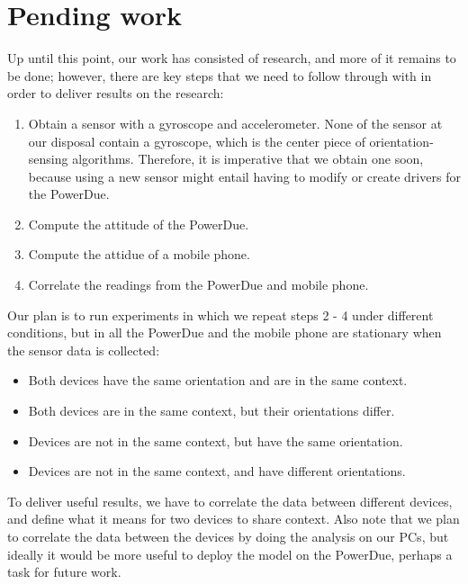 \documentclass[journal]{IEEEtranTIE}
\begin{document}
\section{Pending work}

Up until this point, our work has consisted of research, and more of it
remains to be done; however, there are key steps that we need to follow through
with in order to deliver results on the research:

\begin{enumerate}
\item Obtain a sensor with a gyroscope and accelerometer. None of the sensor at
      our disposal contain a gyroscope, which is the center piece of
      orientation-sensing algorithms. Therefore, it is imperative that we obtain
      one soon, because using a new sensor might entail having to modify or
      create drivers for the PowerDue.
\item Compute the attitude of the PowerDue.
\item Compute the attidue of a mobile phone.
\item Correlate the readings from the PowerDue and mobile phone.
\end{enumerate}

Our plan is to run experiments in which we repeat steps 2 - 4 under different
conditions, but in all the PowerDue and the mobile phone are stationary when the
sensor data is collected:

\begin{itemize}
\item Both devices have the same orientation and are in the same context.
\item Both devices are in the same context, but their orientations differ.
\item Devices are not in the same context, but have the same orientation.
\item Devices are not in the same context, and have different orientations.
\end{itemize}

To deliver useful results, we have to correlate the data between different
devices, and define what it means for two devices to share context. Also note
that we plan to correlate the data between the devices by doing the
analysis on our PCs, but ideally it would be more useful to deploy the model
on the PowerDue, perhaps a task for future work.
\end{document}
